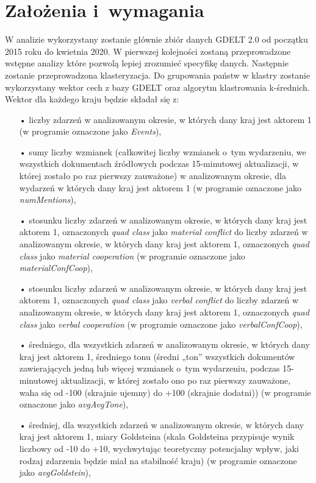 \documentclass[11pt]{report}
\begin{document}
    \section{Założenia i~wymagania}\label{sec:założenia-i-wymagania}
    W analizie wykorzystany zostanie głównie zbiór danych GDELT 2.0 od początku 2015 roku do kwietnia 2020.
    W pierwszej kolejności zostaną przeprowadzone wstępne analizy które pozwolą lepiej zrozumieć specyfikę danych.
    Następnie zostanie przeprowadzona klasteryzacja.
    Do grupowania państw w klastry zostanie wykorzystany wektor cech z bazy GDELT oraz algorytm klastrowania k-średnich.
    Wektor dla każdego kraju będzie składał się z:
    \begin{enumerate}
        \item[•] liczby zdarzeń w analizowanym okresie, w których dany kraj jest aktorem 1 (w programie oznaczone jako \textit{Events}),
        \item[•] sumy liczby wzmianek (całkowitej liczby wzmianek o~tym wydarzeniu, we wszystkich dokumentach źródłowych podczas 15-minutowej aktualizacji, w której zostało po raz pierwszy zauważone) w analizowanym okresie, dla wydarzeń w których dany kraj jest aktorem 1 (w programie oznaczone jako \textit{numMentions}),
        \item[•] stosunku liczby zdarzeń w analizowanym okresie, w których dany kraj jest aktorem 1, oznaczonych \textit{quad class} jako \textit{material conflict} do liczby zdarzeń w analizowanym okresie, w których dany kraj jest aktorem 1, oznaczonych \textit{quad class} jako \textit{material cooperation} (w programie oznaczone jako \textit{materialConfCoop}),
        \item[•] stosunku liczby zdarzeń w analizowanym okresie, w których dany kraj jest aktorem 1, oznaczonych \textit{quad class} jako \textit{verbal conflict} do liczby zdarzeń w analizowanym okresie, w których dany kraj jest aktorem 1, oznaczonych \textit{quad class} jako \textit{verbal cooperation} (w programie oznaczone jako \textit{verbalConfCoop}),
        \item[•] średniego, dla wszystkich zdarzeń w analizowanym okresie, w których dany kraj jest aktorem 1, średniego tonu (średni „ton” wszystkich dokumentów zawierających jedną lub więcej wzmianek o~tym wydarzeniu, podczas 15-minutowej aktualizacji, w której zostało ono po raz pierwszy zauważone, waha się od -100 (skrajnie ujemny) do +100 (skrajnie dodatni)) (w programie oznaczone jako \textit{avgAvgTone}),
        \item[•] średniej, dla wszystkich zdarzeń w analizowanym okresie, w których dany kraj jest aktorem 1, miary Goldsteina (skala Goldsteina przypisuje wynik liczbowy od -10 do +10, wychwytując teoretyczny potencjalny wpływ, jaki rodzaj zdarzenia będzie miał na stabilność kraju) (w programie oznaczone jako \textit{avgGoldstein}),

\end{enumerate}
\end{document}

